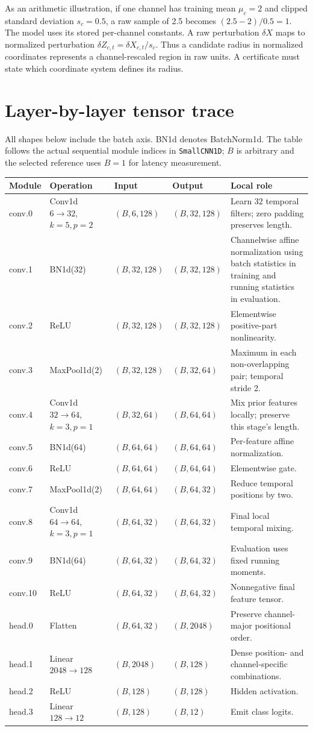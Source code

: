 \documentclass[11pt,a4paper]{article}
\newcommand{\code}[1]{{\small\ttfamily\nolinkurl{#1}}}
\begin{document}
As an arithmetic illustration, if one channel has training mean $\mu_c=2$ and clipped standard deviation $s_c=0.5$, a raw sample of 2.5 becomes $(2.5-2)/0.5=1$. The model uses its stored per-channel constants. A raw perturbation $\delta X$ maps to normalized perturbation $\delta Z_{c,t}=\delta X_{c,t}/s_c$. Thus a candidate radius in normalized coordinates represents a channel-rescaled region in raw units. A certificate must state which coordinate system defines its radius.

\section{Layer-by-layer tensor trace}
All shapes below include the batch axis. BN1d denotes BatchNorm1d. The table follows the actual sequential module indices in \code{SmallCNN1D}; $B$ is arbitrary and the selected reference uses $B=1$ for latency measurement.
{\footnotesize\renewcommand{\arraystretch}{1.08}
\begin{longtable}{@{}P{1.45cm}P{2.6cm}P{3.05cm}P{3.05cm}P{5cm}@{}}
\toprule Module & Operation & Input & Output & Local role \\
\midrule\endhead
conv.0 & Conv1d $6\to32$, $k=5,p=2$ & $(B,6,128)$ & $(B,32,128)$ & Learn 32 temporal filters; zero padding preserves length.\\
conv.1 & BN1d(32) & $(B,32,128)$ & $(B,32,128)$ & Channelwise affine normalization using batch statistics in training and running statistics in evaluation.\\
conv.2 & ReLU & $(B,32,128)$ & $(B,32,128)$ & Elementwise positive-part nonlinearity.\\
conv.3 & MaxPool1d(2) & $(B,32,128)$ & $(B,32,64)$ & Maximum in each non-overlapping pair; temporal stride 2.\\
conv.4 & Conv1d $32\to64$, $k=3,p=1$ & $(B,32,64)$ & $(B,64,64)$ & Mix prior features locally; preserve this stage's length.\\
conv.5 & BN1d(64) & $(B,64,64)$ & $(B,64,64)$ & Per-feature affine normalization.\\
conv.6 & ReLU & $(B,64,64)$ & $(B,64,64)$ & Elementwise gate.\\
conv.7 & MaxPool1d(2) & $(B,64,64)$ & $(B,64,32)$ & Reduce temporal positions by two.\\
conv.8 & Conv1d $64\to64$, $k=3,p=1$ & $(B,64,32)$ & $(B,64,32)$ & Final local temporal mixing.\\
conv.9 & BN1d(64) & $(B,64,32)$ & $(B,64,32)$ & Evaluation uses fixed running moments.\\
conv.10 & ReLU & $(B,64,32)$ & $(B,64,32)$ & Nonnegative final feature tensor.\\
head.0 & Flatten & $(B,64,32)$ & $(B,2048)$ & Preserve channel-major positional order.\\
head.1 & Linear $2048\to128$ & $(B,2048)$ & $(B,128)$ & Dense position- and channel-specific combinations.\\
head.2 & ReLU & $(B,128)$ & $(B,128)$ & Hidden activation.\\
head.3 & Linear $128\to12$ & $(B,128)$ & $(B,12)$ & Emit class logits.\\
\bottomrule\end{longtable}
}
\end{document}
